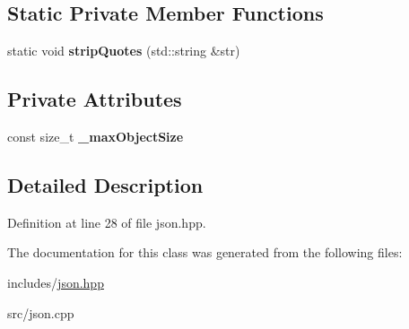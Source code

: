 \subsection*{Static Private Member Functions}
\begin{DoxyCompactItemize}
\item 
\hypertarget{classJSONParser_a6ae123bb0cea1ddb9645af8ceb2bfdd6}{}static void {\bfseries strip\+Quotes} (std\+::string \&str)\label{classJSONParser_a6ae123bb0cea1ddb9645af8ceb2bfdd6}

\end{DoxyCompactItemize}
\subsection*{Private Attributes}
\begin{DoxyCompactItemize}
\item 
\hypertarget{classJSONParser_abee0c8cbb3eea5782648693985806cd2}{}const size\+\_\+t {\bfseries \+\_\+max\+Object\+Size}\label{classJSONParser_abee0c8cbb3eea5782648693985806cd2}

\end{DoxyCompactItemize}


\subsection{Detailed Description}


Definition at line 28 of file json.\+hpp.



The documentation for this class was generated from the following files\+:\begin{DoxyCompactItemize}
\item 
includes/\hyperlink{json_8hpp}{json.\+hpp}\item 
src/json.\+cpp\end{DoxyCompactItemize}
